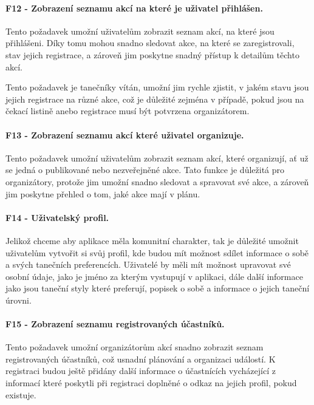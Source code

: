 \paragraph{F12 - Zobrazení seznamu akcí na které je uživatel přihlášen.}\label{req:F12}
Tento požadavek umožní uživatelům zobrazit seznam akcí, na které jsou přihlášeni. Díky tomu mohou snadno sledovat akce, na které se zaregistrovali, stav jejich registrace, a zároveň jim poskytne snadný přístup k detailům těchto akcí.

Tento požadavek je tanečníky vítán, umožní jim rychle zjistit, v jakém stavu jsou jejich registrace na různé akce, což je důležité zejména v případě, pokud jsou na čekací listině anebo registrace musí být potvrzena organizátorem.

\paragraph{F13 - Zobrazení seznamu akcí které uživatel organizuje.}\label{req:F13}
Tento požadavek umožní uživatelům zobrazit seznam akcí, které organizují, ať už se jedná o publikované nebo nezveřejněné akce. Tato funkce je důležitá pro organizátory, protože jim umožní snadno sledovat a spravovat své akce, a zároveň jim poskytne přehled o tom, jaké akce mají v plánu. 

\paragraph{F14 - Uživatelský profil.}\label{req:F14}
Jelikož chceme aby aplikace měla komunitní charakter, tak je důležité umožnit uživatelům vytvořit si svůj profil, kde budou mít možnost sdílet informace o sobě a svých tanečních preferencích. Uživatelé by měli mít možnost upravovat své osobní údaje, jako je jméno za kterým vystupují v aplikaci, dále další informace jako jsou taneční styly které preferují, popisek o sobě a informace o jejich taneční úrovni.

\paragraph{F15 - Zobrazení seznamu registrovaných účastníků.}\label{req:F15}
Tento požadavek umožní organizátorům akcí snadno zobrazit seznam registrovaných účastníků, což usnadní plánování a organizaci událostí. K registraci budou ještě přidány další informace o účastnících vycházející z informací které poskytli při registraci doplněné o odkaz na jejich profil, pokud existuje.

